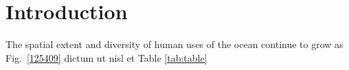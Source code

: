 \section{Introduction}
\label{introduction}

The spatial extent and diversity of human uses of the ocean continue to grow as  Fig.~\ref{125409} dictum ut nisl et Table \ref{tab:table}
